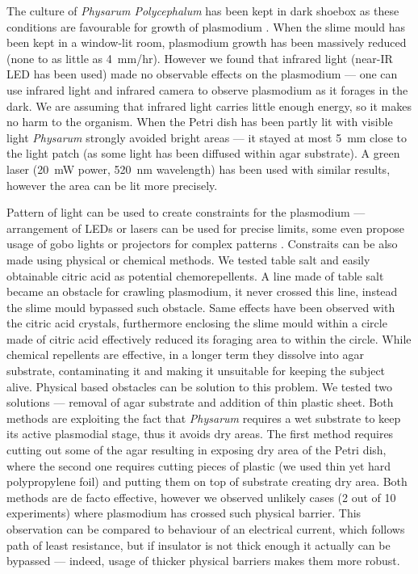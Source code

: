 The culture of \textit{Physarum Polycephalum} has been kept in dark shoebox as these conditions are favourable for growth of plasmodium \cite{adamatzky2010physarum}. When the slime mould has been kept in a window-lit room, plasmodium growth has been massively reduced (none to as little as 4~mm/hr). However we found that infrared light (near-IR LED has been used) made no observable effects on the plasmodium --- one can use infrared light and infrared camera to observe plasmodium as it forages in the dark. We are assuming that infrared light carries little enough energy, so it makes no harm to the organism. When the Petri dish has been partly lit with visible light \textit{Physarum} strongly avoided bright areas --- it stayed at most 5~mm close to the light patch (as some light has been diffused within agar substrate). A green laser (20~mW power, 520~nm wavelength) has been used with similar results, however the area can be lit more precisely. 

Pattern of light can be used to create constraints for the plasmodium --- arrangement of LEDs or lasers can be used for precise limits, some even propose usage of gobo lights or projectors for complex patterns \cite{zhu2013amoeba}. Constraits can be also made using physical or chemical methods. We tested table salt and easily obtainable citric acid as potential chemorepellents. A line made of table salt became an obstacle for crawling plasmodium, it never crossed this line, instead the slime mould bypassed such obstacle. Same effects have been observed with the citric acid crystals, furthermore enclosing the slime mould within a circle made of citric acid effectively reduced its foraging area to within the circle. While chemical repellents are effective, in a longer term they dissolve into agar substrate, contaminating it and making it unsuitable for keeping the subject alive. Physical based obstacles can be solution to this problem. We tested two solutions --- removal of agar substrate and addition of thin plastic sheet. Both methods are exploiting the fact that \textit{Physarum} requires a wet substrate to keep its active plasmodial stage, thus it avoids dry areas. The first method requires cutting out some of the agar resulting in exposing dry area of the Petri dish, where the second one requires cutting pieces of plastic (we used thin yet hard polypropylene foil) and putting them on top of substrate creating dry area. Both methods are de facto effective, however we observed unlikely cases (2 out of 10 experiments) where plasmodium has crossed such physical barrier. This observation can be compared to behaviour of an electrical current, which follows path of least resistance, but if insulator is not thick enough it actually can be bypassed --- indeed, usage of thicker physical barriers makes them more robust. 

